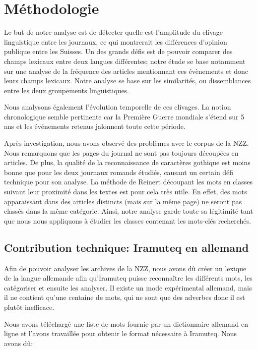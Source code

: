 \documentclass[french,a4paper]{article}
\begin{document}
\section*{Méthodologie}

Le but de notre analyse est de détecter quelle est l'amplitude du clivage linguistique entre les journaux, ce qui montrerait les différences d'opinion publique entre les Suisses.
Un des grands défis est de pouvoir comparer des champs lexicaux entre deux langues différentes; notre étude se base notamment sur une analyse de la fréquence des articles mentionnant ces évènements et donc leurs champs lexicaux.
Notre analyse se base sur les similarités, ou dissemblances entre les deux groupements linguistiques.

Nous analysons également l'évolution temporelle de ces clivages.
La notion chronologique semble pertinente car la Première Guerre mondiale s'étend sur 5 ans et les événements retenus jalonnent toute cette période.  

Après investigation, nous avons observé des problèmes avec le corpus de la NZZ.
Nous remarquons que les pages du journal ne sont pas toujours découpées en articles. 
De plus, la qualité de la reconnaissance de caractères gothique est moins bonne que pour les deux journaux romands étudiés, causant un certain défi technique pour son analyse.
La méthode de Reinert découpant les mots en classes suivant leur proximité dans les textes est pour cela très utile.
En effet, des mots apparaissant dans des articles distincts (mais sur la même page) ne seront pas classés dans la même catégorie.
Ainsi, notre analyse garde toute sa légitimité tant que nous nous appliquons à étudier les classes contenant les mots-clés recherchés.

\subsection*{Contribution technique: Iramuteq en allemand}

Afin de pouvoir analyser les archives de la NZZ, nous avons dû créer un lexique de la langue allemande afin qu'Iramuteq puisse reconnaître les différents mots, les catégoriser et ensuite les analyser.
Il existe un mode \og expérimental \fg{} allemand, mais il ne contient qu'une centaine de mots, qui ne sont que des adverbes donc il est plutôt inefficace.

Nous avons téléchargé une liste de mots fournie par un dictionnaire allemand en ligne \cite{dict-de} et l'avons travaillée pour obtenir le format nécessaire à Iramuteq.
Nous avons dû:
\end{document}
